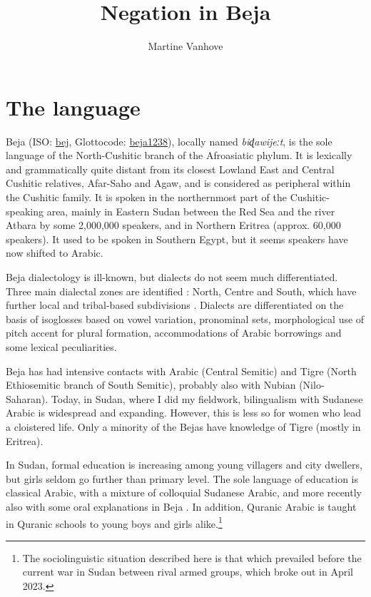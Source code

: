 \documentclass[output=paper,colorlinks,citecolor=brown]{langscibook}
\author{Martine Vanhove\affiliation{CNRS-LLACAN}}
\title{Negation in Beja}
\begin{document}
\maketitle 

\section{The language}

Beja (ISO: \href{https://iso639-3.sil.org/code/bej}{bej}, Glottocode: \href{https://glottolog.org/resource/languoid/id/beja1238}{beja1238}), locally named \textit{biɖawijeːt}, is the sole language of the North-Cushitic branch of the Afroasiatic phylum. It is lexically and grammatically quite distant from its closest Lowland East and Central Cushitic relatives, Afar-Saho and Agaw, and is considered as peripheral within the Cushitic family. It is spoken in the northernmost part of the Cushitic-speaking area, mainly in Eastern Sudan between the Red Sea and the river Atbara by some 2,000,000 speakers, and in Northern Eritrea (approx. 60,000 speakers). It used to be spoken in Southern Egypt, but it seems speakers have now shifted to Arabic.

Beja dialectology is ill-known, but dialects do not seem much differentiated. Three main dialectal zones are identified \citep{Morin1995}: North, Centre and South, which have further local and tribal-based subdivisions \citep{Wedekind2012}. Dialects are differentiated on the basis of isoglosses based on vowel variation, pronominal sets, morphological use of pitch accent for plural formation, accommodations of Arabic borrowings and some lexical peculiarities.

Beja has had intensive contacts with Arabic (Central Semitic) and Tigre (North Ethiosemitic branch of South Semitic), probably also with Nubian (Nilo-Saharan). Today, in Sudan, where I did my fieldwork, bilingualism with Sudanese Arabic is widespread and expanding. However, this is less so for women who lead a cloistered life. Only a minority of the Bejas have knowledge of Tigre (mostly in Eritrea).

In Sudan, formal education is increasing among young villagers and city dwellers, but girls seldom go further than primary level. The sole language of education is classical Arabic, with a mixture of colloquial Sudanese Arabic, and more recently also with some oral explanations in Beja \citep{Onour2015}. In addition, Quranic Arabic is taught in Quranic schools to young boys and girls alike.\footnote{The sociolinguistic situation described here is that which prevailed before the current war in Sudan between rival armed groups, which broke out in April 2023.}
\end{document}

